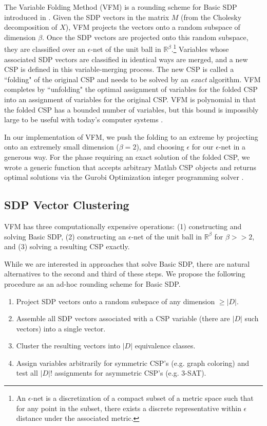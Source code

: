 \documentclass[12pt]{article} %
\begin{document}
The Variable Folding Method (VFM) is a rounding scheme for Basic SDP introduced in \cite{raghavendra2009round}. Given the SDP vectors in the matrix $M$ (from the Cholesky decomposition of $X$), VFM projects the vectors onto a random subspace of dimension $\beta$. Once the SDP vectors are projected onto this random subspace, they are classified over an $\epsilon$-net of the unit ball in $\mathbb{R}^\beta$.\footnote{An $\epsilon$-net is a discretization of a compact subset of a metric space such that for any point in the subset, there exists a discrete representative within $\epsilon$ distance under the associated metric.} Variables whose associated SDP vectors are classified in identical ways are merged, and a new CSP is defined in this variable-merging process. The new CSP is called a ``folding" of the original CSP and needs to be solved by an \textit{exact} algorithm. VFM completes by ``unfolding" the optimal assignment of variables for the folded CSP into an assignment of variables for the original CSP. VFM is polynomial in that the folded CSP has a bounded number of variables, but this bound is impossibly large to be useful with today's computer systems \citep{dwivedi2015introduction}. 

In our implementation of VFM, we push the folding to an extreme by projecting onto an extremely small dimension ($\beta = 2$), and choosing $\epsilon$ for our $\epsilon$-net in a generous way. For the phase requiring an exact solution of the folded CSP, we wrote a generic function that accepts arbitrary Matlab CSP objects and returns optimal solutions via the Gurobi Optimization integer programming solver \cite{gurobi}.

\subsection{SDP Vector Clustering}

VFM has three computationally expensive operations: (1) constructing and solving Basic SDP, (2) constructing an $\epsilon$-net of the unit ball in $\mathbb{R}^\beta$ for $\beta>>2$, and (3) solving a resulting CSP exactly.

While we are interested in approaches that solve Basic SDP, there are natural alternatives to the second and third of these steps. We propose the following procedure as an ad-hoc rounding scheme for Basic SDP.
\begin{enumerate}
\item Project SDP vectors onto a random subspace of any dimension $\geq |D|$.
\item Assemble all SDP vectors associated with a CSP variable (there are $|D|$ such vectors) into a single vector.
\item Cluster the resulting vectors into $|D|$ equivalence classes.
\item Assign variables arbitrarily for symmetric CSP's (e.g. graph coloring) and test all $|D|!$ assignments for asymmetric CSP's (e.g. 3-SAT).
\end{enumerate}
\end{document}
